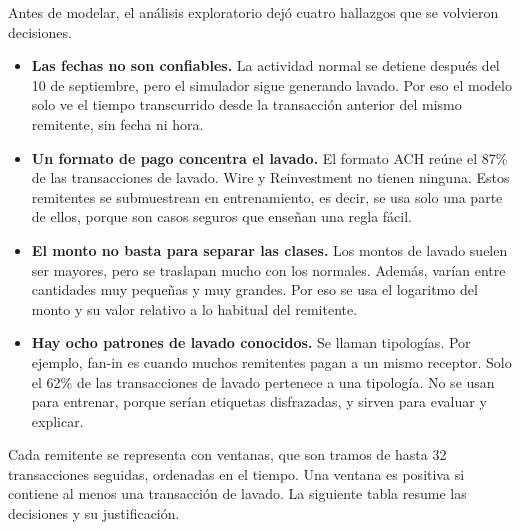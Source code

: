 \documentclass[11pt]{article}
\begin{document}
Antes de modelar, el análisis exploratorio dejó cuatro hallazgos que se volvieron decisiones.
\begin{itemize}
  \item \textbf{Las fechas no son confiables.} La actividad normal se detiene después del 10 de septiembre, pero el simulador sigue generando lavado. Por eso el modelo solo ve el tiempo transcurrido desde la transacción anterior del mismo remitente, sin fecha ni hora.
  \item \textbf{Un formato de pago concentra el lavado.} El formato ACH reúne el 87\% de las transacciones de lavado. Wire y Reinvestment no tienen ninguna. Estos remitentes se submuestrean en entrenamiento, es decir, se usa solo una parte de ellos, porque son casos seguros que enseñan una regla fácil.
  \item \textbf{El monto no basta para separar las clases.} Los montos de lavado suelen ser mayores, pero se traslapan mucho con los normales. Además, varían entre cantidades muy pequeñas y muy grandes. Por eso se usa el logaritmo del monto y su valor relativo a lo habitual del remitente.
  \item \textbf{Hay ocho patrones de lavado conocidos.} Se llaman tipologías. Por ejemplo, fan-in es cuando muchos remitentes pagan a un mismo receptor. Solo el 62\% de las transacciones de lavado pertenece a una tipología. No se usan para entrenar, porque serían etiquetas disfrazadas, y sirven para evaluar y explicar.
\end{itemize}

Cada remitente se representa con ventanas, que son tramos de hasta 32 transacciones seguidas, ordenadas en el tiempo. Una ventana es positiva si contiene al menos una transacción de lavado. La siguiente tabla resume las decisiones y su justificación.
\end{document}
